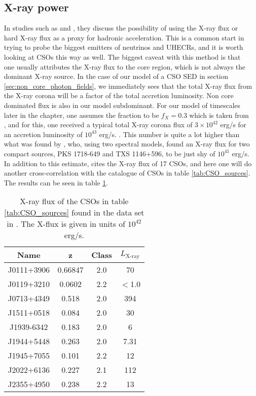 \subsection{X-ray power}
In studies such as \cite{Jacobsen:2015mga} and \cite{10.1111/j.1745-3933.2008.00499.x}, they discuss the possibility of using the X-ray flux or hard X-ray flux as a proxy for hadronic acceleration. This is a common start in trying to probe the biggest emitters of neutrinos and UHECRs, and it is worth looking at CSOs this way as well. The biggest caveat with this method is that one usually attributes the X-ray flux to the core region, which is not always the dominant X-ray source. In the case of our model of a CSO SED in section \ref{sec:non_core_photon_fields}, we immediately sees that the total X-ray flux from the X-ray corona will be a factor of the total accretion luminosity. Non core dominated flux is also in our model subdominant. For our model of timescales later in the chapter, one assumes the fraction to be $f_X = 0.3$ which is taken from \cite{Ghisellini_2009}, and for this, one received a typical total X-ray corona flux of $3 \times 10^{42}$ erg/s for an accretion luminosity of $10^{43}$ erg/s. .  This number is quite a lot higher than what was found by \cite{bronzini2024investigating}, who, using two spectral models, found an X-ray flux for two compact sources, PKS 1718-649 and TXS 1146+596, to be just shy of $10^{41}$ erg/s. In addition to this estimate, \cite{W_jtowicz_2020} cites the X-ray flux of 17 CSOs, and here one will do another cross-correlation with the catalogue of CSOs in table \ref*{tab:CSO_sources}. The results can be seen in table \ref{tab:CSO_xray}.


\begin{table}
    \centering
    \begin{tabular}{|c|c|c|c|}
        \hline
        \textbf{Name} & \textbf{z} & \textbf{Class} &   \textbf{$L_{\text{X-ray}}$} \\
        \hline

        

        J0111+3906 & 0.66847 & 2.0 & 70 \\
        J0119+3210 & 0.0602 & 2.2 & $<$1.0 \\
        J0713+4349 & 0.518 & 2.0 & 394 \\
        J1511+0518 & 0.084 & 2.0 & 30 \\
        J1939-6342 & 0.183 & 2.0 & 6 \\
        J1944+5448 & 0.263 & 2.0 & 7.31 \\
        J1945+7055 & 0.101 & 2.2 & 12 \\ 
        J2022+6136& 0.227 & 2.1 & 112 \\
        J2355+4950 & 0.238 & 2.2 & 13 \\
        \hline
    \end{tabular}
    \caption{X-ray flux of the CSOs in table \ref{tab:CSO_sources} found in the data set in \cite{W_jtowicz_2020}. The X-flux is given in units of $10^{42}$ erg/s.}
\label{tab:CSO_xray}
\end{table}


